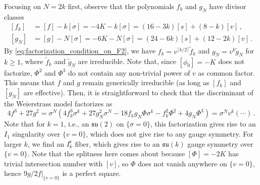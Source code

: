 \documentclass[11pt, a4paper]{article}
\newcommand*{\fksu}{\ensuremath{\mathfrak{su}}}
\begin{document}
Focusing on $N=2k$ first, observe that the polynomials $f_k$ and $g_N$ have divisor classes
\begin{equation}
\begin{split}
    [f_k] & = [f] - k[\sigma] = -4K - k[\sigma] = (16-3k)[s] + (8-k)[v] \, , \\
    [g_N] & = [g] - N[\sigma] = -6K - N[\sigma] = (24 - 6k)[s] + (12 - 2k)[v] \, .
\end{split}
\end{equation}
By \cref{eq:factorization_condition_on_F2}, we have $f_k = v^{\lceil k/2 \rceil} \tilde{f}_k$ and $g_N =v^k \tilde{g}_N$ for $k\ge 1$, where $\tilde{f}_k$ and $\tilde{g}_N$ are irreducible.
Note that, since $[\phi_0] = -K$ does not factorize, $\Phi^2$ and $\Phi^3$ do not contain any non-trivial power of $v$ as common factor.
This means that $f$ and $g$ remain generically irreducible (as long as $[f_k]$ and $[g_N]$ are effective).
Then, it is straightforward to check that the discriminant of the Weierstrass model factorizes as
\begin{equation}
    4f^3 + 27g^2 = \sigma^N \left(4 f_k^3 \sigma^k + 27 g_N^2 \sigma^N - 18 f_k g_N \Phi \sigma^k - f_k^2 \Phi^2 + 4g_N \Phi^3\right)
    = \sigma^N v^{k} (\dotsb)  \, .
\end{equation}
Note that for $k=1$, i.e., an $\fksu(2)$ on $\{\sigma=0\}$, this factorization gives rise to an $I_1$ singularity over $\{v=0\}$, which does not give rise to any gauge symmetry.
For larger $k$, we find an $I^\text{s}_k$ fiber, which gives rise to an $\fksu(k)$ gauge symmetry over $\{v=0\}$.
Note that the splitness here comes about because $[\Phi] = -2K$ has trivial intersection number with $[v]$, so $\Phi$ does not vanish anywhere on $\{v=0\}$, hence $\left.9g/2f\right|_{\{v=0\}}$ is a perfect square.
\end{document}
